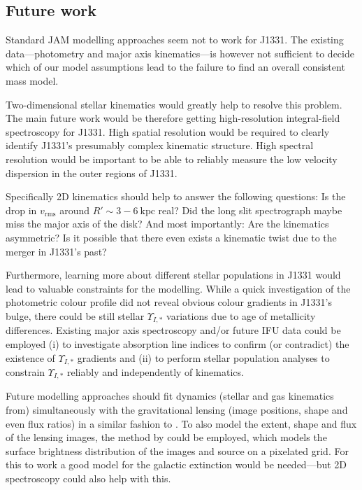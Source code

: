 \documentclass[useAMS,usenatbib]{mnras}
\begin{document}
\subsection{Future work}

Standard JAM modelling approaches seem not to work for J1331. The existing data---photometry and major axis kinematics---is however not sufficient to decide which of our model assumptions lead to the failure to find an overall consistent mass model.

Two-dimensional stellar kinematics would greatly help to resolve this problem. The main future work would be therefore getting high-resolution integral-field spectroscopy for J1331. High spatial resolution would be required to clearly identify J1331's presumably complex kinematic structure. High spectral resolution would be important to be able to reliably measure the low velocity dispersion in the outer regions of J1331.

Specifically 2D kinematics should help to answer the following questions: Is the drop in $v_\text{rms}$ around $R' \sim 3-6~\text{kpc}$ real? Did the long slit spectrograph maybe miss the major axis of the disk? And most importantly: Are the kinematics asymmetric? Is it possible that there even exists a kinematic twist due to the merger in J1331's past?

Furthermore, learning more about different stellar populations in J1331 would lead to valuable constraints for the modelling. While a quick investigation of the photometric colour profile did not reveal obvious colour gradients in J1331's bulge, there could be still stellar $\Upsilon_{I,*}$ variations due to age of metallicity differences. Existing major axis spectroscopy and/or future IFU data could be employed (i) to investigate absorption line indices to confirm (or contradict) the existence of $\Upsilon_{I,*}$ gradients and (ii) to perform stellar population analyses to constrain $\Upsilon_{I,*}$ reliably and independently of kinematics.

Future modelling approaches should fit dynamics (stellar and gas kinematics from) simultaneously with the gravitational lensing (image positions, shape and even flux ratios) in a similar fashion to \citet{SWELLSIV}. To also model the extent, shape and flux of the lensing images, the method by \citet{2004ApJ...611..739T,2003ApJ...590..673W} could be employed, which models the surface brightness distribution of the images and source on a pixelated grid. For this to work a good model for the galactic extinction would be needed---but 2D spectroscopy could also help with this.
\end{document}

